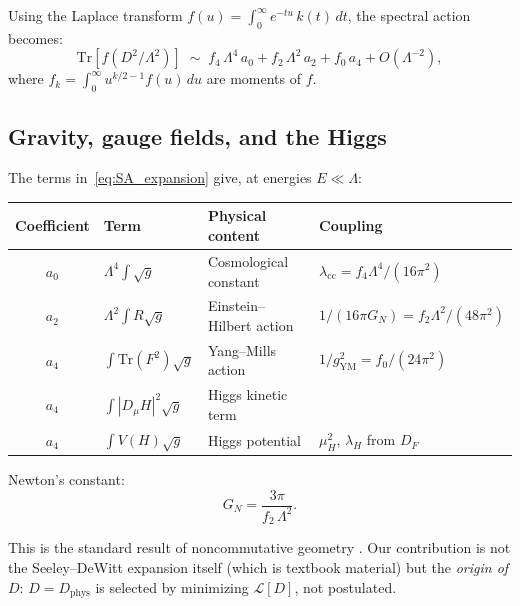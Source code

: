 \documentclass[12pt]{article}
\theoremstyle{definition}
\theoremstyle{remark}
\newcommand{\Tr}{\mathrm{Tr}}
\begin{document}
Using the Laplace transform $f(u) = \int_0^\infty e^{-tu}\,k(t)\,dt$,
the spectral action becomes:
\begin{equation}\label{eq:SA_expansion}
  \Tr[f(D^2/\Lambda^2)]
  \;\sim\; f_4\,\Lambda^4\,a_0
         + f_2\,\Lambda^2\,a_2
         + f_0\,a_4
         + O(\Lambda^{-2}),
\end{equation}
where $f_k = \int_0^\infty u^{k/2-1}f(u)\,du$ are moments of $f$.

\subsection{Gravity, gauge fields, and the Higgs}

The terms in~\eqref{eq:SA_expansion} give, at energies $E \ll \Lambda$:

\begin{center}
\renewcommand{\arraystretch}{1.3}
\begin{tabular}{@{}clll@{}}
\toprule
\textbf{Coefficient} & \textbf{Term} & \textbf{Physical content} &
\textbf{Coupling} \\
\midrule
$a_0$ & $\Lambda^4 \int\sqrt{g}$ & Cosmological constant &
  $\lambda_{\mathrm{cc}} = f_4\Lambda^4/(16\pi^2)$ \\
$a_2$ & $\Lambda^2 \int R\sqrt{g}$ & Einstein--Hilbert action &
  $1/(16\pi G_N) = f_2\Lambda^2/(48\pi^2)$ \\
$a_4$ & $\int\Tr(F^2)\sqrt{g}$ & Yang--Mills action &
  $1/g_{\mathrm{YM}}^2 = f_0/(24\pi^2)$ \\
$a_4$ & $\int|D_\mu H|^2\sqrt{g}$ & Higgs kinetic term & \\
$a_4$ & $\int V(H)\sqrt{g}$ & Higgs potential &
  $\mu_H^2,\,\lambda_H$ from $D_F$ \\
\bottomrule
\end{tabular}
\end{center}

\noindent
Newton's constant:
\begin{equation}\label{eq:Newton}
  G_N = \frac{3\pi}{f_2\,\Lambda^2}.
\end{equation}

This is the standard result of noncommutative geometry
\cite{ConnesChamseddine1997,CCM2007,Vassilevich2003}.
Our contribution is not the Seeley--DeWitt expansion itself
(which is textbook material) but the \emph{origin of $D$}:
$D = D_{\mathrm{phys}}$ is selected by minimizing $\mathcal{L}[D]$,
not postulated.

\end{document}
